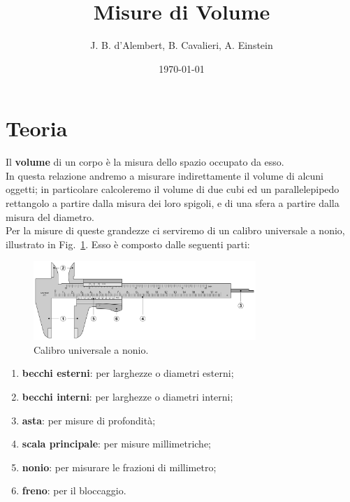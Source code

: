 \documentclass[12pt]{scrartcl}
\title{Misure di Volume}
\author{J. B. d'Alembert, B. Cavalieri, A. Einstein}
\date{\today}
\begin{document}
\maketitle

\section{Teoria}

Il \textbf{volume} di un corpo è la misura dello spazio occupato da esso.\\[1em]
In questa relazione andremo a misurare indirettamente il volume di alcuni
oggetti; in particolare calcoleremo il volume di due cubi ed un parallelepipedo
rettangolo a partire dalla misura dei loro spigoli, e di una sfera a
partire dalla misura del diametro.\\[1em]
Per la misure di queste grandezze ci serviremo di un calibro universale a nonio,
illustrato in Fig.~\ref{fig::calibro}. Esso è composto dalle seguenti parti:

\begin{figure}[htbp]
  \centering
  \includegraphics[width=0.75\textwidth]{includes/pictures/vernier.pdf}
  \caption{Calibro universale a nonio.}
  \label{fig::calibro}
\end{figure}

\begin{multicols}{2}
\begin{enumerate}
  \item \textbf{becchi esterni}: per larghezze o diametri esterni;
  \item \textbf{becchi interni}: per larghezze o diametri interni;
  \item \textbf{asta}: per misure di profondità;
  \item \textbf{scala principale}: per misure millimetriche;
  \item \textbf{nonio}: per misurare le frazioni di millimetro;
  \item \textbf{freno}: per il bloccaggio.
\end{enumerate}
\end{multicols}
\end{document}
